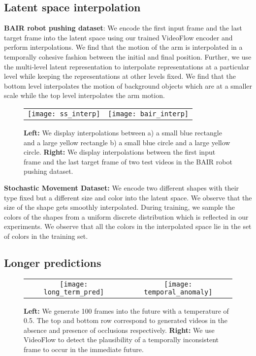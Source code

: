 \documentclass{article} \usepackage{iclr2020_conference,times}
\begin{document}
\subsection{Latent space interpolation}

\textbf{BAIR robot pushing dataset}: We encode the first input frame and the last target frame into the latent space using our trained VideoFlow encoder and perform interpolations. We find that the motion of the arm is interpolated in a temporally cohesive fashion between the initial and final position. Further, we use the multi-level latent representation to interpolate representations at a particular level while keeping the representations at other levels fixed. We find that the bottom level interpolates the motion of background objects which are at a smaller scale while the top level interpolates the arm motion.
\begin{figure}[h]
\begin{tabular}{cc}
\texttt{[image: ss\_interp]} & \texttt{[image: bair\_interp]} \\
\end{tabular}

\caption{\textbf{Left:} We display interpolations between a) a small blue rectangle and a large yellow rectangle b) a small blue circle and a large yellow circle. \textbf{Right:} We display interpolations between the first input frame and the last target frame of two test videos in the BAIR robot pushing dataset.}
\label{fig:vf_interp}
\end{figure}

\textbf{Stochastic Movement Dataset:} We encode two different shapes with their type fixed but a different size and color into the latent space. We observe that the size of the shape gets smoothly interpolated. During training, we sample the colors of the shapes from a uniform discrete distribution which is reflected in our experiments. We observe that all the colors in the interpolated space lie in the set of colors in the training set.

\subsection{Longer predictions}

\begin{figure}[h]
\begin{tabular}{cc}
\texttt{[image: long\_term\_pred]} & \texttt{[image: temporal\_anomaly]} \\
\end{tabular}

\caption{\textbf{Left:} We generate 100 frames into the future with a temperature of 0.5. The top and bottom row correspond to generated videos in the absence and presence of occlusions respectively. \textbf{Right:} We use VideoFlow to detect the plausibility of a temporally inconsistent frame to occur in the immediate future.}
\label{fig:long_temporal}
\end{figure}
\end{document}
